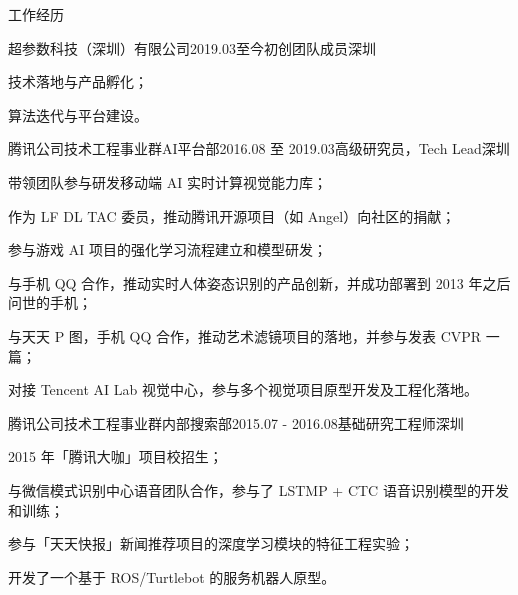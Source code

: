 \documentclass[UTF8]{cv_professional-cn} %
\begin{document}
\begin{rSection}{工作经历}

  \begin{rSubsection}{超参数科技（深圳）有限公司}{2019.03至今}{初创团队成员}{深圳}
    \item 技术落地与产品孵化；
    \item 算法迭代与平台建设。
  \end{rSubsection}

  \begin{rSubsection}{腾讯公司技术工程事业群AI平台部}{2016.08 至 2019.03}{高级研究员，Tech Lead}{深圳}
    \item 带领团队参与研发移动端 AI 实时计算视觉能力库；
    \item 作为 LF DL TAC 委员，推动腾讯开源项目（如 Angel）向社区的捐献；
    \item 参与游戏 AI 项目的强化学习流程建立和模型研发；
    \item 与手机 QQ 合作，推动实时人体姿态识别的产品创新，并成功部署到 2013 年之后问世的手机；
    \item 与天天 P 图，手机 QQ 合作，推动艺术滤镜项目的落地，并参与发表 CVPR 一篇；
    \item 对接 Tencent AI Lab 视觉中心，参与多个视觉项目原型开发及工程化落地。
  \end{rSubsection}

	\begin{rSubsection}{腾讯公司技术工程事业群内部搜索部}{2015.07 - 2016.08}{基础研究工程师}{深圳}
		\item 2015 年「腾讯大咖」项目校招生；
		\item 与微信模式识别中心语音团队合作，参与了 LSTMP + CTC 语音识别模型的开发和训练；
		\item 参与「天天快报」新闻推荐项目的深度学习模块的特征工程实验；
		\item 开发了一个基于 ROS/Turtlebot 的服务机器人原型。
	\end{rSubsection}

\end{rSection}


\end{document}
